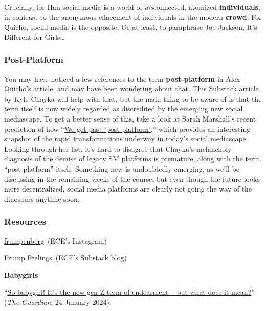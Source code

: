 \documentclass[
  letterpaper,
  DIV=11,
  numbers=noendperiod,
  oneside]{scrartcl}
\begin{document}
Crucially, for Han social media is a world of \emph{dis}connected,
atomized \textbf{individuals}, in contrast to the anonymous effacement
of individuals in the modern \textbf{crowd}. For Quicho, social media is
the opposite. Or at least, to paraphrase Joe Jackson, It's Different for
Girls\ldots{}

\subsubsection{Post-Platform}\label{post-platform}

You may have noticed a few references to the term \textbf{post-platform}
in Alex Quicho's article, and may have been wondering about that.
\href{https://kylechayka.substack.com/p/the-post-platform-internet}{This
Substack article} by Kyle Chayka will help with that, but the main thing
to be aware of is that the term itself is now widely regarded as
discredited by the emerging new social mediascape. To get a better sense
of this, take a look at Sarah Marshall's recent prediction of how
``\href{https://www.niemanlab.org/2023/12/we-get-past-post-platform/}{We
get past `post-platform'},'' which provides an interesting snapshot of
the rapid transformations underway in today's social mediascape. Looking
through her list, it's hard to disagree that Chayka's melancholy
diagnosis of the demise of legacy SM platforms is premature, along with
the term ``post-platform'' itself. Something new is undoubtedly
emerging, as we'll be discussing in the remaining weeks of the course,
but even though the future looks more decentralized, social media
platforms are clearly not going the way of the dinosaurs anytime soon.

\subsubsection{Resources}\label{resources}

\href{https://www.instagram.com/frumpenberg/}{frumpenberg}~(ECE's
Instagram)

\href{https://emmacopleyeisenberg.substack.com/p/welcome-to-frump-feelings-b6e}{Frump
Feelings}~(ECE's Substack blog)

\textbf{Babygirls}

``\href{https://www.theguardian.com/lifeandstyle/2024/jan/24/so-babygirl-its-the-new-gen-z-term-of-endearment-but-what-does-it-mean}{So
babygirl! It's the new gen Z term of endearment -- but what does it
mean?}'' (\emph{The Guardian}, 24 January 2024).
\end{document}
